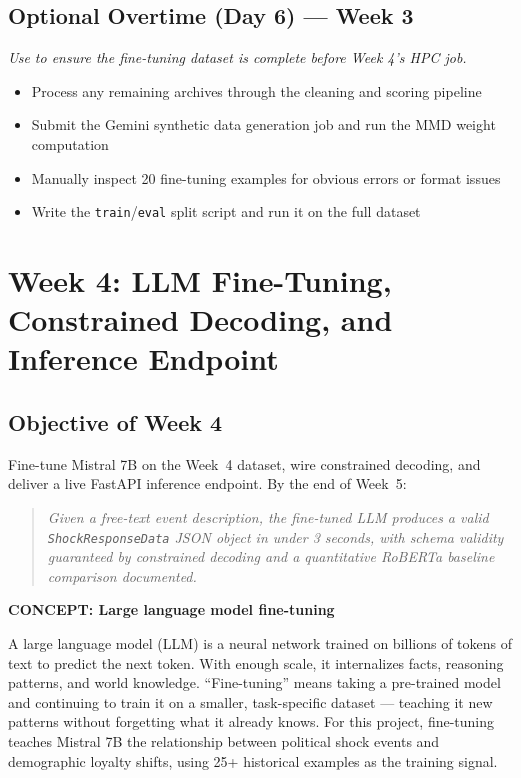 \documentclass[11pt]{article}
\newcommand{\concept}[2]{%
  \begin{mdframed}[style=conceptbox]
  {\small\bfseries\color{bluefg}CONCEPT: #1}\par\smallskip #2
  \end{mdframed}}
\begin{document}
\subsection*{Optional Overtime (Day 6) --- Week 3}
\textit{Use to ensure the fine-tuning dataset is complete before Week 4's HPC job.}
\begin{itemize}[leftmargin=1.6em, itemsep=2pt]
  \item Process any remaining archives through the cleaning and scoring pipeline
  \item Submit the Gemini synthetic data generation job and run the MMD weight computation
  \item Manually inspect 20 fine-tuning examples for obvious errors or format issues
  \item Write the \texttt{train}/\texttt{eval} split script and run it on the full dataset
\end{itemize}

\section{Week 4: LLM Fine-Tuning, Constrained Decoding, and Inference Endpoint}

\subsection*{Objective of Week 4}

Fine-tune Mistral 7B on the Week~4 dataset, wire constrained decoding, and deliver a live
FastAPI inference endpoint. By the end of Week~5:

\begin{quote}
\textit{Given a free-text event description, the fine-tuned LLM produces a valid
\texttt{ShockResponseData} JSON object in under 3 seconds, with schema validity
guaranteed by constrained decoding and a quantitative RoBERTa baseline comparison
documented.}
\end{quote}

\concept{Large language model fine-tuning}{
A large language model (LLM) is a neural network trained on billions of tokens of
text to predict the next token. With enough scale, it internalizes facts, reasoning
patterns, and world knowledge. ``Fine-tuning'' means taking a pre-trained model and
continuing to train it on a smaller, task-specific dataset --- teaching it new
patterns without forgetting what it already knows. For this project, fine-tuning
teaches Mistral 7B the relationship between political shock events and demographic
loyalty shifts, using 25+ historical examples as the training signal.
}
\end{document}
